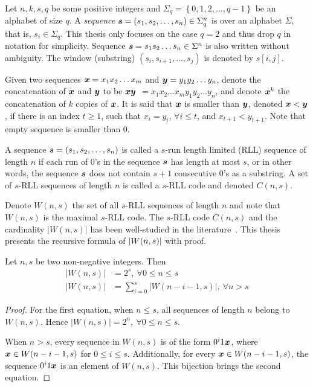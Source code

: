 Let $n,k,s,q$ be some positive integers and $\Sigma_{q} = \left\{0,1,2,\ldots,q-1\right\}$ be an alphabet of size $q$. A \emph{sequence} ${\boldsymbol s}=\left(s_{1},s_{2},\ldots,s_{n}\right)\in\Sigma^{n}_{q}$ is over an alphabet $\Sigma$, that is, $s_{i}\in\Sigma_{q}$. This thesis only focuses on the case $q=2$ and thus drop $q$ in notation for simplicity. Sequence ${\boldsymbol s}=s_{1}s_{2}\ldots s_{n}\in\Sigma^{n}$ is also written without ambiguity. The window (substring) $(s_{i},s_{i+1},\ldots,s_{j})$ is denoted by $s[i,j]$. 

Given two sequences ${\boldsymbol x}=x_{1}x_{2}\ldots x_{m}$ and ${\boldsymbol y}=y_{1}y_{2}\ldots y_{n}$, denote the concatenation of ${\boldsymbol x}$ and ${\boldsymbol y}$ to be ${\boldsymbol x}{\boldsymbol y} $ $=x_{1}x_{2}\ldots x_{m}y_{1}y_{2}\ldots y_{n}$, and denote ${\boldsymbol x}^{k}$ the concatenation of $k$ copies of ${\boldsymbol x}$. It is said that ${\boldsymbol x}$ is smaller than ${\boldsymbol y}$, denoted ${\boldsymbol x}<{\boldsymbol y}$, if there is an index $t\geq1$, such that $x_{i}=y_{i}$, $\forall i\leq t$, and $x_{t+1}<y_{t+1}$. Note that empty sequence is smaller than $0$.

\begin{definition}
    A  sequence ${\boldsymbol s} = (s_1,s_2,\ldots,s_n)$ is called a $s$-run length limited (RLL) sequence of length $n$ if each run of 0's in the sequence ${\boldsymbol s}$ has length at most $s$, or in other words, the sequence ${\boldsymbol s}$ does not contain $s+1$ consecutive 0's as a substring. 
A set of $s$-RLL sequences of length $n$ is called a $s$-RLL code and denoted $C(n,s)$.
\end{definition}

Denote $W(n,s)$ the set of all $s$-RLL sequences of length $n$ and note that $W(n,s)$ is the maximal $s$-RLL code. The $s$-RLL code $C(n,s)$ and the cardinality $|W(n,s)|$ has been well-studied in the literature~\cite{blake1982enumeration, kurmaev2011constant}. This thesis presents the recursive formula of $\left \lvert W(n,s) \right \rvert$ with proof.

\begin{lemma}[Cardinality of $W(n,s)$]\label{lem:card_W}
    Let $n,s$ be two non-negative integers. Then
    \begin{align*}
        \lvert W(n,s) \rvert &= 2^{s},\ \forall 0\leq n\leq s \\
        \lvert W(n,s) \rvert &= \sum_{i=0}^{s} \lvert W(n-i-1,s)\rvert,\ \forall n>s
    \end{align*}
\end{lemma}
\begin{proof}
    For the first equation, when $n\leq s$, all sequences of length $n$ belong to $W(n,s)$. Hence $\lvert W(n,s) \rvert = 2^{n},\ \forall 0\leq n\leq s$. 
    
    When $n>s$, every sequence in $W(n,s)$ is of the form $0^{i}1{\boldsymbol x}$, where ${\boldsymbol x} \in W(n-i-1,s)$ for $0 \leq i \leq s$. Additionally, for every ${\boldsymbol x}\in W(n-i-1,s)$, the sequence $0^{i}1{\boldsymbol x}$ is an element of $W(n,s)$. This bijection brings the second equation.
\end{proof}

